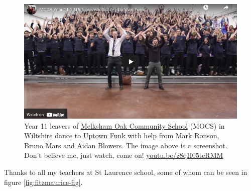 \documentclass[
]{book}
\begin{document}
\begin{figure}

{\centering \includegraphics[width=1\linewidth]{images/youtube-mocs-uptown-funk} 

}

\caption{Year 11 leavers of \href{https://en.wikipedia.org/wiki/Melksham_Oak_Community_School}{Melksham Oak Community School} (MOCS) in Wiltshire dance to \href{https://en.wikipedia.org/wiki/Uptown_Funk}{Uptown Funk} with help from Mark Ronson, Bruno Mars and Aidan Blowers. The image above is a screenshot. Don't believe me, just watch, come on! \href{https://youtu.be/z8qH05teRMM}{youtu.be/z8qH05teRMM} \citep{uptownfunk}}\label{fig:uptown-funk-fig}
\end{figure}



Thanks to all my teachers at St Laurence school, some of whom can be seen in figure \ref{fig:fitzmaurice-fig}.
\end{document}
